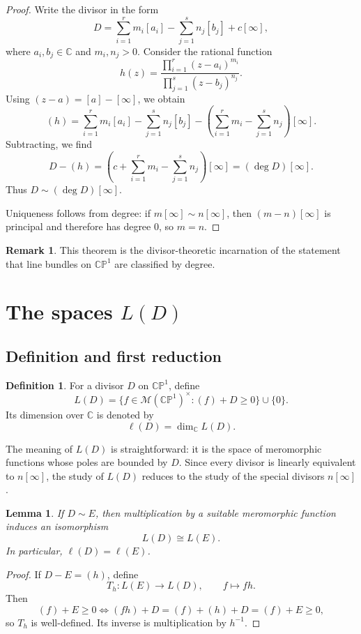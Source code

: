 \documentclass[11pt]{article}
\newcommand{\C}{\mathbb{C}}
\newcommand{\CP}{\mathbb{CP}}
\newcommand{\MM}{\mathcal{M}}
\newcommand{\degd}{\operatorname{deg}}
\newcommand{\CPone}{\CP^1}
\newcommand{\ellD}{\ell}
\theoremstyle{plain}
\newtheorem{lemma}[theorem]{Lemma}
\theoremstyle{definition}
\newtheorem{definition}[theorem]{Definition}
\newtheorem{remark}[theorem]{Remark}
\begin{document}
\begin{proof}
Write the divisor in the form
\[
D=\sum_{i=1}^r m_i[a_i]-\sum_{j=1}^s n_j[b_j]+c[\infty],
\]
where $a_i,b_j\in\C$ and $m_i,n_j>0$. Consider the rational function
\[
h(z)=\frac{\prod_{i=1}^r (z-a_i)^{m_i}}{\prod_{j=1}^s (z-b_j)^{n_j}}.
\]
Using $(z-a)=[a]-[\infty]$, we obtain
\[
(h)=\sum_{i=1}^r m_i[a_i]-\sum_{j=1}^s n_j[b_j]-\left(\sum_{i=1}^r m_i-\sum_{j=1}^s n_j\right)[\infty].
\]
Subtracting, we find
\[
D-(h)=\left(c+\sum_{i=1}^r m_i-\sum_{j=1}^s n_j\right)[\infty]=(\degd D)[\infty].
\]
Thus $D\sim (\degd D)[\infty]$.

Uniqueness follows from degree: if $m[\infty]\sim n[\infty]$, then $(m-n)[\infty]$ is principal and therefore has degree $0$, so $m=n$.
\end{proof}

\begin{remark}
This theorem is the divisor-theoretic incarnation of the statement that line bundles on $\CPone$ are classified by degree.
\end{remark}

\section{The spaces \texorpdfstring{$L(D)$}{L(D)}}
\subsection{Definition and first reduction}
\begin{definition}
For a divisor $D$ on $\CPone$, define
\[
L(D)=\{f\in\MM(\CPone)^\times:(f)+D\ge 0\}\cup\{0\}.
\]
Its dimension over $\C$ is denoted by
\[
\ellD(D)=\dim_{\C}L(D).
\]
\end{definition}

The meaning of $L(D)$ is straightforward: it is the space of meromorphic functions whose poles are bounded by $D$. Since every divisor is linearly equivalent to $n[\infty]$, the study of $L(D)$ reduces to the study of the special divisors $n[\infty]$.

\begin{lemma}
If $D\sim E$, then multiplication by a suitable meromorphic function induces an isomorphism
\[
L(D)\cong L(E).
\]
In particular, $\ellD(D)=\ellD(E)$.
\end{lemma}

\begin{proof}
If $D-E=(h)$, define
\[
T_h\colon L(E)\longrightarrow L(D),\qquad f\longmapsto fh.
\]
Then
\[
(f)+E\ge 0 \iff (fh)+D=(f)+(h)+D=(f)+E\ge 0,
\]
so $T_h$ is well-defined. Its inverse is multiplication by $h^{-1}$.
\end{proof}
\end{document}
